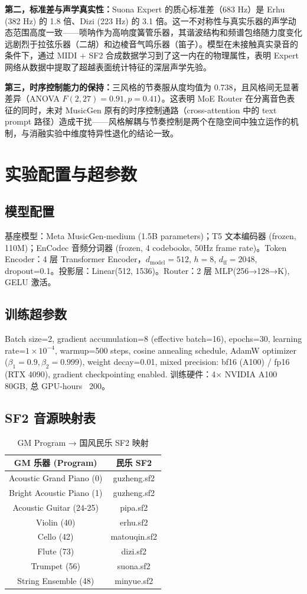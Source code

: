 \documentclass[11pt,twocolumn]{article}
\begin{document}
\textbf{第二，标准差与声学真实性：}Suona Expert 的质心标准差（683 Hz）是 Erhu (382 Hz) 的 1.8 倍、Dizi (223 Hz) 的 3.1 倍。这一不对称性与真实乐器的声学动态范围高度一致——唢呐作为高响度簧管乐器，其谐波结构和频谱包络随力度变化远剧烈于拉弦乐器（二胡）和边棱音气鸣乐器（笛子）。模型在未接触真实录音的条件下，通过 MIDI + SF2 合成数据学习到了这一内在的物理属性，表明 Expert 网络从数据中提取了超越表面统计特征的深层声学先验。

\textbf{第三，时序控制能力的保持：}三风格的节奏服从度均值为 0.738，且风格间无显著差异（ANOVA $F(2,27)=0.91, p=0.41$）。这表明 MoE Router 在分离音色表征的同时，未对 MusicGen 原有的时序控制通路（cross-attention 中的 text prompt 路径）造成干扰——风格解耦与节奏控制是两个在隐空间中独立运作的机制，与消融实验中维度特异性退化的结论一致。


\newpage
\appendix
\section{实验配置与超参数}

\subsection{模型配置}
基座模型：Meta MusicGen-medium (1.5B parameters)；T5 文本编码器 (frozen, 110M)；EnCodec 音频分词器 (frozen, 4 codebooks, 50Hz frame rate)。Token Encoder：4 层 Transformer Encoder，$d_{\text{model}}=512$, $h=8$, $d_{\text{ff}}=2048$, dropout=0.1。投影层：Linear(512, 1536)。Router：2 层 MLP(256→128→K), GELU 激活。

\subsection{训练超参数}
Batch size=2, gradient accumulation=8 (effective batch=16), epochs=30, learning rate=$1\times10^{-4}$, warmup=500 steps, cosine annealing schedule, AdamW optimizer ($\beta_1=0.9,\beta_2=0.999$), weight decay=0.01, mixed precision: bf16 (A100) / fp16 (RTX 4090), gradient checkpointing enabled. 训练硬件：4× NVIDIA A100 80GB, 总 GPU-hours ~200。

\subsection{SF2 音源映射表}
\begin{table}[H]
\centering\footnotesize
\caption{GM Program → 国风民乐 SF2 映射}
\begin{tabular}{c|c}
\toprule
GM 乐器 (Program) & 民乐 SF2 \\
\midrule
Acoustic Grand Piano (0) & guzheng.sf2 \\
Bright Acoustic Piano (1) & guzheng.sf2 \\
Acoustic Guitar (24-25) & pipa.sf2 \\
Violin (40) & erhu.sf2 \\
Cello (42) & matouqin.sf2 \\
Flute (73) & dizi.sf2 \\
Trumpet (56) & suona.sf2 \\
String Ensemble (48) & minyue.sf2 \\
\bottomrule
\end{tabular}
\end{table}
\end{document}
